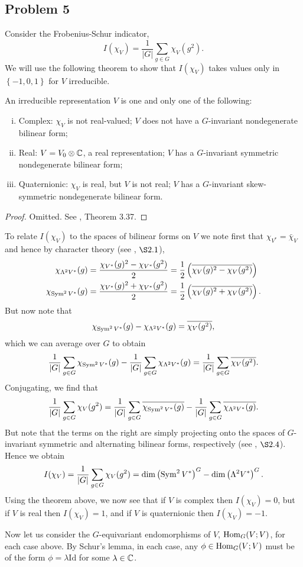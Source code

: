 \documentclass{../../mathnotes}
\begin{document}
\subsection*{Problem 5}

Consider the Frobenius-Schur indicator,
\[I(\chi_V)=\frac{1}{|G|}\sum_{g\in G}\chi_V(g^2).\]
We will use the following theorem to show that $I(\chi_V)$ takes values only in $\left\{ -1,0,1 \right\}$ for $V$ irreducible.
\begin{thm*}
    An irreducible representation $V$ is one and only one of the following:
    \begin{enumerate}[(i)]
        \item Complex: $\chi_V$ is not real-valued; $V$ does not have a $G$-invariant nondegenerate bilinear form;
        \item Real: $V=V_0\otimes \mathbb{C}$, a real representation; $V$ has a $G$-invariant symmetric nondegenerate bilinear form;
        \item Quaternionic: $\chi_V$ is real, but $V$ is not real; $V$ has a $G$-invariant skew-symmetric nondegenerate bilinear form.
    \end{enumerate}
\end{thm*}
\begin{proof}
    Omitted. See \cite{F-H}, Theorem 3.37.
\end{proof}

To relate $I(\chi_V)$ to the spaces of bilinear forms on $V$ we note first that $\chi_{V^*}=\bar\chi_V$ and hence by character theory (see \cite{F-H}, $\S 2.1$),
\begin{align*}
    \chi_{\Lambda^2V^*}(g)&=\frac{\chi_{V^*}(g)^2-\chi_{V^*}(g^2)}{2}=\frac{1}{2}\left(\overline{\chi_{V}(g)^2-\chi_{V}(g^2)}\right)\\
    \chi_{\operatorname{Sym}^2V^*}(g)&=\frac{\chi_{V^*}(g)^2+\chi_{V^*}(g^2)}{2}=\frac{1}{2}\left(\overline{\chi_{V}(g)^2+\chi_{V}(g^2)}\right).
\end{align*}
But now note that
\[\chi_{\operatorname{Sym}^2 V^*}(g)-\chi_{\Lambda^2 V^*}(g)=\overline{\chi_V(g^2)},\]
which we can average over $G$ to obtain
\[\frac{1}{|G|}\sum_{g\in G}\chi_{\operatorname{Sym}^2 V^*}(g)-\frac{1}{|G|}\sum_{g\in G}\chi_{\Lambda^2 V^*}(g)=\frac{1}{|G|}\sum_{g\in G}\overline{\chi_V(g^2)}.\]
Conjugating, we find that
\[\frac{1}{|G|}\sum_{g\in G}\chi_V(g^2)=\frac{1}{|G|}\sum_{g\in G}\overline{\chi_{\operatorname{Sym}^2 V^*}(g)}-\frac{1}{|G|}\sum_{g\in G}\overline{\chi_{\Lambda^2 V^*}(g)}.\]
But note that the terms on the right are simply projecting onto the spaces of $G$-invariant symmetric and alternating bilinear forms, respectively (see \cite{F-H}, $\S2.4$).
Hence we obtain
\[I(\chi_V)=\frac{1}{|G|}\sum_{g\in G}\chi_V(g^2)=\dim\left( \operatorname{Sym}^2 V^* \right)^G-\dim\left( \Lambda^2 V^* \right)^G.\]
Using the theorem above, we now see that if $V$ is complex then $I(\chi_V)=0$, but if $V$ is real then $I(\chi_V)=1$, and if $V$ is quaternionic then
$I(\chi_V)=-1$.

Now let us consider the $G$-equivariant endomorphisms of $V$, $\operatorname{Hom}_G(V;V)$, for each case above. By Schur's lemma, in each case, any $\phi\in\operatorname{Hom}_G(V;V)$ must
be of the form $\phi=\lambda \text{Id}$ for some $\lambda\in\mathbb{C}$.






\end{document}
